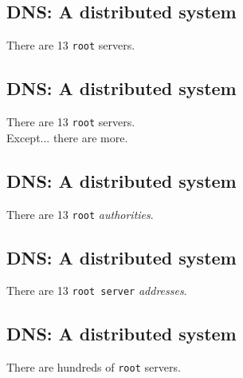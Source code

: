 \documentclass[xga]{xdvislides}
\begin{document}
\subsection{DNS: A distributed system}
\vspace{.5in}
\begin{center}
	\Huge
	There are 13 \verb+root+ servers. \\
\end{center}
\Normalsize

\subsection{DNS: A distributed system}
\vspace{.5in}
\begin{center}
	\Huge
	There are 13 \verb+root+ servers. \\
	\vspace{.5in}
	Except... there are more.
\end{center}
\Normalsize

\subsection{DNS: A distributed system}
\vspace{.5in}
\begin{center}
	\Huge
	There are 13 \verb+root+ {\em authorities}. \\
\end{center}
\Normalsize

\subsection{DNS: A distributed system}
\vspace{.5in}
\begin{center}
	\Huge
	There are 13 \verb+root server+ {\em addresses}. \\
\end{center}
\Normalsize

\subsection{DNS: A distributed system}
\vspace{.5in}
\begin{center}
	\Huge
	There are hundreds of \verb+root+ servers. \\
\end{center}
\Normalsize
\end{document}
